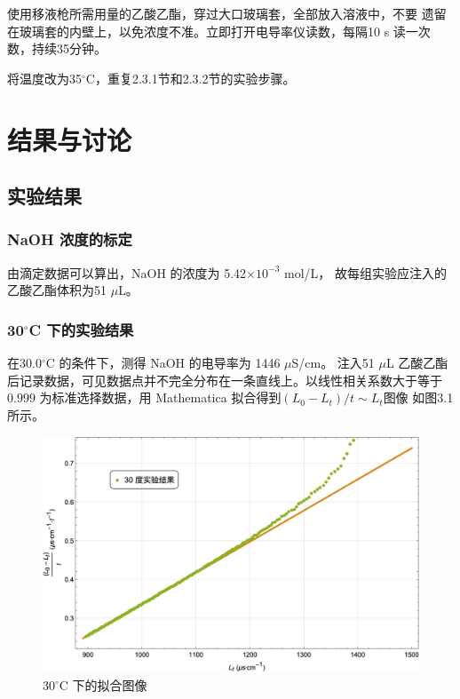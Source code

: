 \documentclass[12pt]{ctexart}
\numberwithin{equation}{section}
\begin{document}
使用移液枪所需用量的乙酸乙酯，穿过大口玻璃套，全部放入溶液中，不要
遗留在玻璃套的内壁上，以免浓度不准。立即打开电导率仪读数，每隔10 s
读一次数，持续35分钟。

将温度改为35$^\circ$C，重复2.3.1节和2.3.2节的实验步骤。

\section{结果与讨论}
\subsection{实验结果}
\subsubsection{NaOH 浓度的标定}

由滴定数据可以算出，NaOH 的浓度为 5.42$\times 10^{-3}$ mol/L，
故每组实验应注入的乙酸乙酯体积为51 $\mu$L。

\subsubsection{\texorpdfstring{30$^\circ$C 下的实验结果}{30 度下的实验结果}}

在30.0$^\circ$C 的条件下，测得 NaOH 的电导率为 1446 $\mu$S/cm。
注入51 $\mu$L 乙酸乙酯后记录数据，可见数据点并不完全分布在一条直线上。以线性相关系数大于等于 $0.999$ 为标准选择数据，用 Mathematica 拟合得到$(L_0 - L_t)/t \sim L_t$图像
如图3.1所示。
\begin{figure}[!h]
    \centering
    \includegraphics[scale=0.45]{30degree.jpg}
    \caption{30$^\circ$C 下的拟合图像}
\end{figure}
\end{document}
